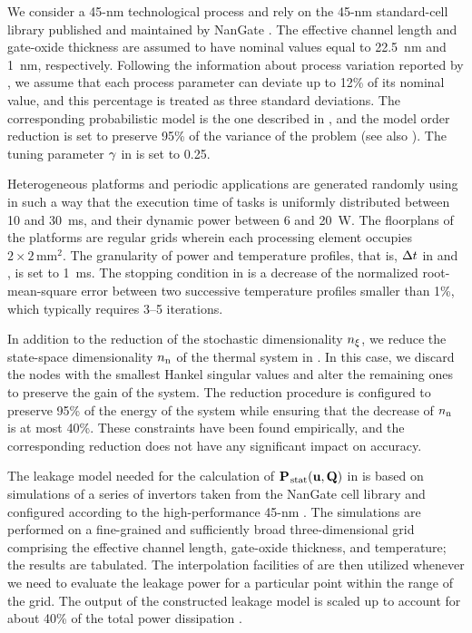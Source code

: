 We consider a 45-nm technological process and rely on the 45-nm standard-cell library published and maintained by NanGate \cite{nangate}.
The effective channel length and gate-oxide thickness are assumed to have nominal values equal to 22.5~nm and 1~nm, respectively.
Following the information about process variation reported by  \cite{itrs}, we assume that each process parameter can deviate up to 12\% of its nominal value, and this percentage is treated as three standard deviations.
The corresponding probabilistic model is the one described in , and the model order reduction is set to preserve 95\% of the variance of the problem (see also ).
The tuning parameter $\gamma$ in  is set to 0.25.

Heterogeneous platforms and periodic applications are generated randomly using  \cite{dick1998} in such a way that the execution time of tasks is uniformly distributed between 10 and 30~ms, and their dynamic power between 6 and 20~W.
The floorplans of the platforms are regular grids wherein each processing element occupies $2 \times 2\,\text{mm}^2$.
The granularity of power and temperature profiles, that is, $\Delta t$ in  and , is set to 1~ms.
The stopping condition in  is a decrease of the normalized root-mean-square error between two successive temperature profiles smaller than 1\%, which typically requires 3--5 iterations.

In addition to the reduction of the stochastic dimensionality ${n_\xi}$, we reduce the state-space dimensionality ${n_\text{n}}$ of the thermal system in .
In this case, we discard the nodes with the smallest Hankel singular values and alter the remaining ones to preserve the  gain of the system.
The reduction procedure is configured to preserve 95\% of the energy of the system while ensuring that the decrease of ${n_\text{n}}$ is at most 40\%.
These constraints have been found empirically, and the corresponding reduction does not have any significant impact on accuracy.

The leakage model needed for the calculation of $\mathbf{P}_{\text{\kern0.1emstat}}(\mathbf{u}, \mathbf{Q})$ in  is based on  simulations of a series of  invertors taken from the NanGate cell library and configured according to the high-performance 45-nm  \cite{ptm}.
The simulations are performed on a fine-grained and sufficiently broad three-dimensional grid comprising the effective channel length, gate-oxide thickness, and temperature; the results are tabulated.
The interpolation facilities of  \cite{matlab} are then utilized whenever we need to evaluate the leakage power for a particular point within the range of the grid.
The output of the constructed leakage model is scaled up to account for about 40\% of the total power dissipation \cite{liu2007}.

